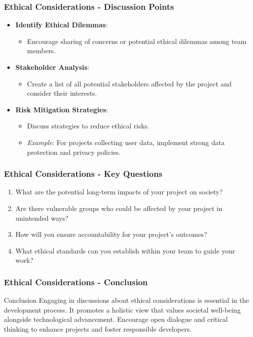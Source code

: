 \documentclass{beamer}
\begin{document}
\begin{frame}[fragile]
    \frametitle{Ethical Considerations - Discussion Points}
    \begin{itemize}
        \item \textbf{Identify Ethical Dilemmas}:
        \begin{itemize}
            \item Encourage sharing of concerns or potential ethical dilemmas among team members.
        \end{itemize}

        \item \textbf{Stakeholder Analysis}:
        \begin{itemize}
            \item Create a list of all potential stakeholders affected by the project and consider their interests.
        \end{itemize}

        \item \textbf{Risk Mitigation Strategies}:
        \begin{itemize}
            \item Discuss strategies to reduce ethical risks.
            \item \textit{Example}: For projects collecting user data, implement strong data protection and privacy policies.
        \end{itemize}
    \end{itemize}
\end{frame}

\begin{frame}[fragile]
    \frametitle{Ethical Considerations - Key Questions}
    \begin{enumerate}
        \item What are the potential long-term impacts of your project on society?
        \item Are there vulnerable groups who could be affected by your project in unintended ways?
        \item How will you ensure accountability for your project’s outcomes?
        \item What ethical standards can you establish within your team to guide your work?
    \end{enumerate}
\end{frame}

\begin{frame}[fragile]
    \frametitle{Ethical Considerations - Conclusion}
    \begin{block}{Conclusion}
        Engaging in discussions about ethical considerations is essential in the development process. It promotes a holistic view that values societal well-being alongside technological advancement. Encourage open dialogue and critical thinking to enhance projects and foster responsible developers.
    \end{block}
\end{frame}
\end{document}

